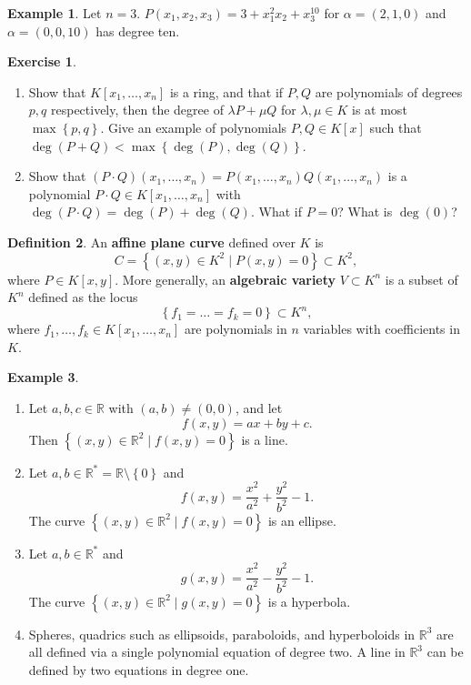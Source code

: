 \documentclass{article}
\newcommand{\R}{\mathbb{R}}
\newcommand{\rb}[1]{\left( #1 \right)}
\renewcommand{\sb}[1]{\left[ #1 \right]}
\newcommand{\cb}[1]{\left\{ #1 \right\}}
\theoremstyle{definition}\newtheorem{definition}{Definition}[section]
\theoremstyle{definition}\newtheorem{notation}[definition]{Notation}
\theoremstyle{definition}\newtheorem{remark}[definition]{Remark}
\theoremstyle{definition}\newtheorem{example}[definition]{Example}
\theoremstyle{definition}\newtheorem{fact}{Fact}
\theoremstyle{definition}\newtheorem{exercise}{Exercise}
\begin{document}
\begin{example}
Let $ n = 3 $. $ P\rb{x_1, x_2, x_3} = 3 + x_1^2x_2 + x_3^{10} $ for $ \alpha = \rb{2, 1, 0} $ and $ \alpha = \rb{0, 0, 10} $ has degree ten.
\end{example}

\begin{exercise}
\hfill
\begin{enumerate}
\item Show that $ K\sb{x_1, \dots, x_n} $ is a ring, and that if $ P, Q $ are polynomials of degrees $ p, q $ respectively, then the degree of $ \lambda P + \mu Q $ for $ \lambda, \mu \in K $ is at most $ \max\cb{p, q} $. Give an example of polynomials $ P, Q \in K\sb{x} $ such that $ \deg\rb{P + Q} < \max\cb{\deg\rb{P}, \deg\rb{Q}} $.
\item Show that $ \rb{P \cdot Q}\rb{x_1, \dots, x_n} = P\rb{x_1, \dots, x_n}Q\rb{x_1, \dots, x_n} $ is a polynomial $ P \cdot Q \in K\sb{x_1, \dots, x_n} $ with $ \deg\rb{P \cdot Q} = \deg\rb{P} + \deg\rb{Q} $. What if $ P = 0 $? What is $ \deg\rb{0} $?
\end{enumerate}
\end{exercise}

\begin{definition}
An \textbf{affine plane curve} defined over $ K $ is
$$ C = \cb{\rb{x, y} \in K^2 \mid P\rb{x, y} = 0} \subset K^2, $$
where $ P \in K\sb{x, y} $. More generally, an \textbf{algebraic variety} $ V \subset K^n $ is a subset of $ K^n $ defined as the locus
$$ \cb{f_1 = \dots = f_k = 0} \subset K^n, $$
where $ f_1, \dots, f_k \in K\sb{x_1, \dots, x_n} $ are polynomials in $ n $ variables with coefficients in $ K $.
\end{definition}

\begin{example}
\hfill
\begin{enumerate}
\item Let $ a, b, c \in \R $ with $ \rb{a, b} \ne \rb{0, 0} $, and let
$$ f\rb{x, y} = ax + by + c. $$
Then $ \cb{\rb{x, y} \in \R^2 \mid f\rb{x, y} = 0} $ is a line.
\item Let $ a, b \in \R^* = \R \setminus \cb{0} $ and
$$ f\rb{x, y} = \dfrac{x^2}{a^2} + \dfrac{y^2}{b^2} - 1. $$
The curve $ \cb{\rb{x, y} \in \R^2 \mid f\rb{x, y} = 0} $ is an ellipse.
\item Let $ a, b \in \R^* $ and
$$ g\rb{x, y} = \dfrac{x^2}{a^2} - \dfrac{y^2}{b^2} - 1. $$
The curve $ \cb{\rb{x, y} \in \R^2 \mid g\rb{x, y} = 0} $ is a hyperbola.
\item Spheres, quadrics such as ellipsoids, paraboloids, and hyperboloids in $ \R^3 $ are all defined via a single polynomial equation of degree two. A line in $ \R^3 $ can be defined by two equations in degree one.
\end{enumerate}
\end{example}
\end{document}
